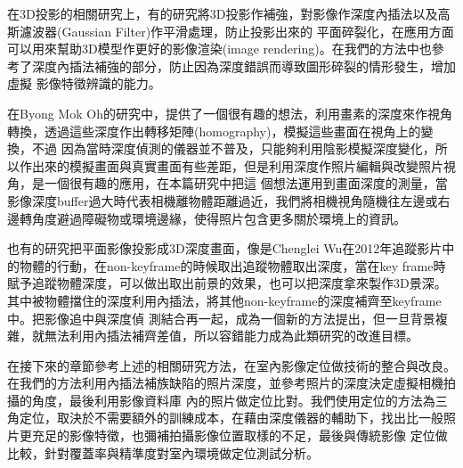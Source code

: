                                                                                                                                                                                                                                                                                                                                                                                                                                                                                                                                                                                                                                                                                                                                                                                                                                                                                                                                                                                                                                    
	在3D投影的相關研究上，有的研究將3D投影作補強\cite{Zhang2010}\cite{Riecher2012}，對影像作深度內插法以及高斯濾波器(Gaussian Filter)作平滑處理，防止投影出來的
平面碎裂化，在應用方面可以用來幫助3D模型作更好的影像渲染(image rendering)。在我們的方法中也參考了深度內插法補強的部分，防止因為深度錯誤而導致圖形碎裂的情形發生，增加虛擬
影像特徵辨識的能力。

	在Byong Mok Oh的研究中\cite{Oh2001}，提供了一個很有趣的想法，利用畫素的深度來作視角轉換，透過這些深度作出轉移矩陣(homography)，模擬這些畫面在視角上的變換，不過
因為當時深度偵測的儀器並不普及，只能夠利用陰影模擬深度變化，所以作出來的模擬畫面與真實畫面有些差距，但是利用深度作照片編輯與改變照片視角，是一個很有趣的應用，在本篇研究中把這
個想法運用到畫面深度的測量，當影像深度buffer過大時代表相機離物體距離過近，我們將相機視角隨機往左邊或右邊轉角度避過障礙物或環境邊緣，使得照片包含更多關於環境上的資訊。
	
	也有的研究把平面影像投影成3D深度畫面，像是Chenglei Wu在2012年\cite{Dichangsheng2012}追蹤影片中的物體的行動，在non-keyframe的時候取出追蹤物體取出深度，當在key 
frame時賦予追蹤物體深度，可以做出取出前景的效果，也可以把深度拿來製作3D景深。其中被物體擋住的深度利用內插法，將其他non-keyframe的深度補齊至keyframe中。把影像追中與深度偵
測結合再一起，成為一個新的方法提出，但一旦背景複雜，就無法利用內插法補齊差值，所以容錯能力成為此類研究的改進目標。	

	在接下來的章節參考上述的相關研究方法，在室內影像定位做技術的整合與改良。在我們的方法利用內插法補族缺陷的照片深度，並參考照片的深度決定虛擬相機拍攝的角度，最後利用影像資料庫
內的照片做定位比對。我們使用定位的方法為三角定位，取決於不需要額外的訓練成本，在藉由深度儀器的輔助下，找出比一般照片更充足的影像特徵，也彌補拍攝影像位置取樣的不足，最後與傳統影像
定位做比較，針對覆蓋率與精準度對室內環境做定位測試分析。	


